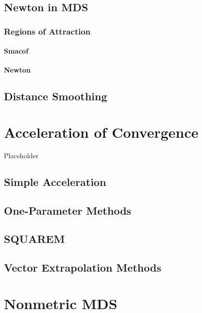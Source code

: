 \documentclass[
  12pt,
]{book}
\begin{document}
\section{Newton in MDS}\label{smacofnewton}

\subsection{Regions of Attraction}\label{attraction}

\subsubsection{Smacof}\label{attractsmacof}

\subsubsection{Newton}\label{attractnewton}

\section{Distance Smoothing}\label{propdistsmo}

\chapter{Acceleration of Convergence}\label{chacceleration}

Placeholder

\section{Simple Acceleration}\label{accelsimple}

\section{One-Parameter Methods}\label{one-parameter-methods}

\section{SQUAREM}\label{squarem}

\section{Vector Extrapolation Methods}\label{vector-extrapolation-methods}

\chapter{Nonmetric MDS}\label{nonmtrmds}
\end{document}
